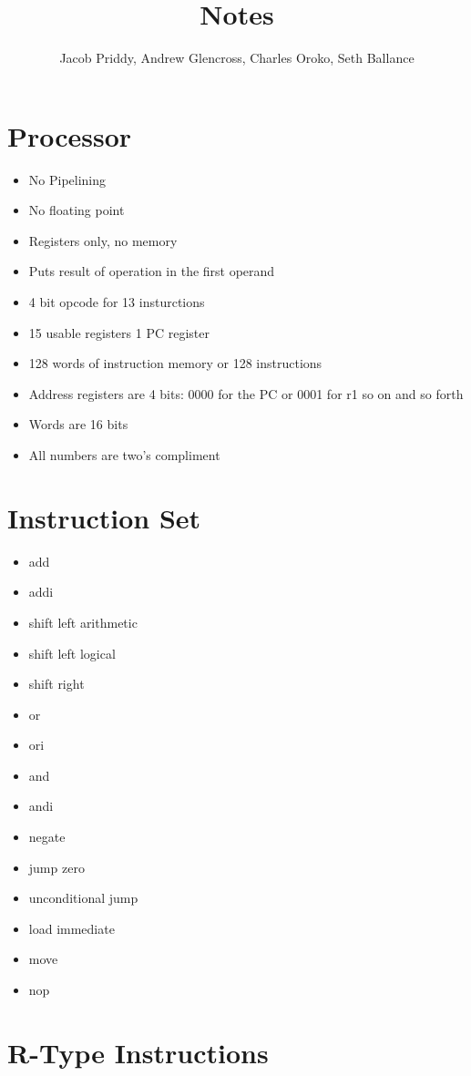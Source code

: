 \documentclass[a4paper]{article}
\title{Notes}
\author{Jacob Priddy, Andrew Glencross, Charles Oroko, Seth Ballance}
\begin{document}
\maketitle

\section{Processor}

\begin{itemize}
\item No Pipelining
\item No floating point
\item Registers only, no memory
\item Puts result of operation in the first operand
\item 4 bit opcode for 13 insturctions
\item 15 usable registers 1 PC register
\item 128 words of instruction memory or 128 instructions
\item Address registers are 4 bits: 0000 for the PC or 0001 for r1 so on and so forth
\item Words are 16 bits
\item All numbers are two's compliment
\end{itemize}

\section{Instruction Set}
\begin{itemize}
\item add
\item addi
\item shift left arithmetic
\item shift left logical
\item shift right
\item or
\item ori
\item and
\item andi
\item negate
\item jump zero
\item unconditional jump
\item load immediate
\item move
\item nop
\end{itemize}

\section{R-Type Instructions}
\end{document}
